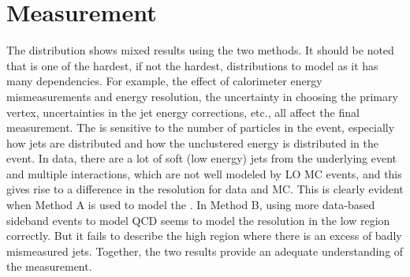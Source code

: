 \section{\met Measurement}
The \met distribution shows mixed results using the two methods. It should be noted that \met is one of the hardest, if not the hardest, distributions to model as it has many dependencies. For example, the effect of calorimeter energy mismeasurements and energy resolution, the uncertainty in choosing the primary vertex, uncertainties in the jet energy corrections, etc., all affect the final \met measurement. The \met is sensitive to the number of particles in the event, especially how jets are distributed and how the unclustered energy is distributed in the event. In data, there are a lot of soft (low energy) jets from the underlying event and multiple interactions, which are not well modeled by LO \pythiaText MC events, and this gives rise to a difference in the \met resolution for data and MC. This is clearly evident when Method A is used to model the \met. In Method B, using more data-based sideband events to model QCD seems to model the \met resolution in the low \met region correctly. But it fails to describe the high \met region where there is an excess of badly mismeasured jets. Together, the two results provide an adequate understanding of the measurement.



